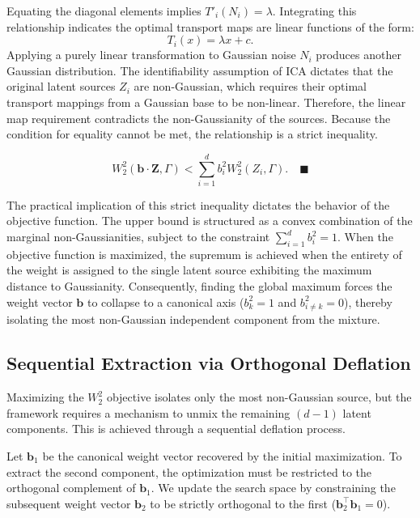 \documentclass[12pt,a4paper,twoside,openany]{book}
\begin{document}
Equating the diagonal elements implies $T'_i(N_i) = \lambda$. Integrating this relationship indicates 
the optimal transport maps are linear functions of the form:
\begin{equation}
    T_i(x) = \lambda x + c.
\end{equation}
Applying a purely linear transformation to Gaussian noise $N_i$ produces another Gaussian distribution. 
The identifiability assumption of ICA dictates that the original latent sources $Z_i$ are non-Gaussian, 
which requires their optimal transport mappings from a Gaussian base to be non-linear. Therefore, the linear map requirement 
contradicts the non-Gaussianity of the sources. Because the condition for equality cannot be met, the relationship is a strict inequality. 

\begin{equation}
    W_2^2(\mathbf{b} \cdot \mathbf{Z}, \Gamma) < \sum_{i=1}^d b_i^2 W_2^2(Z_i, \Gamma). \quad \blacksquare
\end{equation} 

The practical implication of this strict inequality dictates the behavior of the objective function. 
The upper bound is structured as a convex combination of the marginal non-Gaussianities, 
subject to the constraint $\sum_{i=1}^d b_i^2 = 1$. When the objective function is maximized, 
the supremum is achieved when the entirety of the weight is assigned to the single 
latent source exhibiting the maximum distance to Gaussianity. Consequently, finding the global maximum forces 
the weight vector $\mathbf{b}$ to collapse to a canonical axis ($b_k^2 = 1$ and $b_{i \neq k}^2 = 0$), 
thereby isolating the most non-Gaussian independent component from the mixture.

\subsection{Sequential Extraction via Orthogonal Deflation}
Maximizing the $W_2^2$ objective isolates only the most non-Gaussian source, 
but the framework requires a mechanism to unmix the remaining $(d-1)$ latent components. This is achieved through a sequential deflation process.

Let $\mathbf{b}_1$ be the canonical weight vector recovered by the initial maximization. 
To extract the second component, the optimization must be restricted to the orthogonal complement of $\mathbf{b}_1$. 
We update the search space by constraining the subsequent weight vector $\mathbf{b}_2$ to be strictly orthogonal to the first ($\mathbf{b}_2^\top \mathbf{b}_1 = 0$). 
\end{document}

